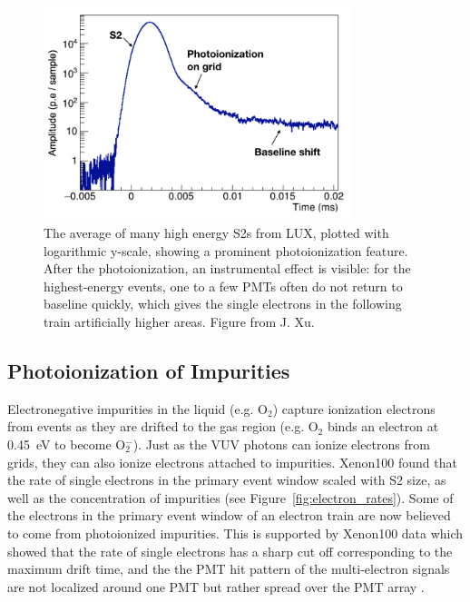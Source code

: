 \begin{figure}[htbp]
\begin{center}
\includegraphics[width=0.8\textwidth]{figures/etrains/s2_averages.png}
\caption{The average of many high energy S2s from \acs{LUX}, plotted with logarithmic y-scale, showing a prominent photoionization feature. After the photoionization, an instrumental effect is visible: for the highest-energy events, one to a few \acs{PMT}s often do not return to baseline quickly, which gives the single electrons in the following train artificially higher areas. Figure from J. Xu. }
\label{fig:s2_averages}
\end{center}
\end{figure}


\subsection{Photoionization of Impurities} 
\label{sec:photoionization_impurities}
Electronegative impurities in the liquid (e.g. O$_{2}$) capture ionization electrons from events as they are drifted to the gas region (e.g. O$_{2}$ binds an electron at 0.45~eV to become O$^{-}_{2}$). Just as the \ac{VUV} photons can ionize electrons from grids, they can also ionize electrons attached to impurities. Xenon100 found that the rate of single electrons in the primary event window scaled with S2 size, as well as the concentration of impurities \cite{Aprile2014} (see Figure~\ref{fig:electron_rates}). Some of the electrons in the primary event window of an electron train are now believed to come from photoionized impurities. This is supported by Xenon100 data which showed that the rate of single electrons has a sharp cut off corresponding to the maximum drift time, and the the PMT hit pattern of the multi-electron signals are not localized around one PMT but rather spread over the PMT array \cite{Aprile2014}. 

